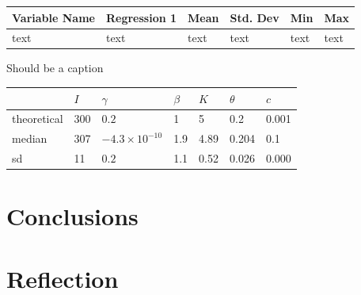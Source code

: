 \documentclass[12pt]{article}
\begin{document}
\begin{minipage}{\linewidth}
\centering
{}\label{tab:title} 
\begin{tabular}{ C{1.25in} C{.85in} *4{C{.75in}}}\toprule[1.5pt]
\bf Variable Name & \bf Regression 1 & \bf Mean & \bf Std. Dev & \bf Min & \bf Max\\\midrule
text        &  text     & text      &  text     &  text     &text\\
\bottomrule[1.25pt]
\end {tabular}\par
\bigskip
Should be a caption
\end{minipage}


\begin{center}
\begin{tabular}{ |p{3cm}||p{1cm}|p{2.5cm}|p{1cm}|p{1cm}|p{1cm}|p{1cm}|  }
\hline
 & $I$ & $\gamma$ & $\beta$ & $K$ & $\theta$ & $c$ \\
  \hline
theoretical  & 300 & $0.2$ & 1 & 5 & 0.2 & 0.001 \\
median & 307 & $-4.3 \times 10^{-10}$ & 1.9 & 4.89 &  0.204 & 0.1 \\
sd &  11 &  $0.2$ &  1.1 & 0.52  & 0.026  & 0.000\\
 \hline
\end{tabular}
\end{center}



\section{Conclusions}




\section{Reflection}









\pagebreak

\nocite{*}



%








\end{document}
